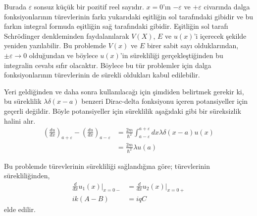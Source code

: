 \documentclass[00_kitap.tex]{subfiles}
\begin{document}
Burada $\varepsilon$ sonsuz küçük bir pozitif reel sayıdır. $x=0$'ın $-\varepsilon$ ve $+\varepsilon$ civarında dalga fonksiyonlarının türevlerinin farkı yukarıdaki eşitliğin sol tarafındaki gibidir ve bu farkın integral formuda eşitliğin sağ tarafındaki gibidir. Eşitliğin sol tarafı Schrödinger denkleminden faydalanılarak $V(X)$, $E$ ve $u(x)$'i içerecek şekilde yeniden yazılabilir. Bu problemde $V(x)$ ve $E$ birer sabit sayı olduklarından, $\pm \varepsilon \rightarrow 0$ olduğundan ve böylece $u(x)$'in sürekliliği gerçekleştiğinden bu integralin cevabı sıfır olacaktır. Böylece bu tür problemler için dalga fonksiyonlarının türevlerinin de  sürekli oldukları kabul edilebilir. 

\begin{tcolorbox}
Yeri geldiğinden ve daha sonra kullanılacağı için şimdiden belirtmek gerekir ki, bu süreklilik $\lambda \delta(x-a)$ benzeri Dirac-delta fonksiyonu içeren potansiyeller için geçerli değildir. Böyle potansiyeller için süreklilik aşağıdaki gibi bir süreksizlik halini alır.
\begin{equation}
\begin{aligned} \left( \frac { d u } { d x } \right) _ { a + \varepsilon } - \left( \frac { d u } { d x } \right) _ { a - \varepsilon } & = \frac { 2 m } { \hbar ^ { 2 } } \int _ { a - \varepsilon } ^ { a + \varepsilon } d x \lambda \delta ( x - a ) u ( x ) \\ & = \frac { 2 m } { \hbar ^ { 2 } } \lambda u ( a ) \end{aligned}
\end{equation}
\end{tcolorbox}
	
Bu problemde türevlerinin sürekliliği sağlandığına göre; türevlerinin sürekliliğinden,
\begin{align}
\frac{d}{dx}u_1(x) \bigg|_{x=0-} &= \frac{d}{dx}u_2(x) \bigg|_{x=0+} \\
i k ( A - B ) &= i q C
\end{align}
elde edilir.
\end{document}

